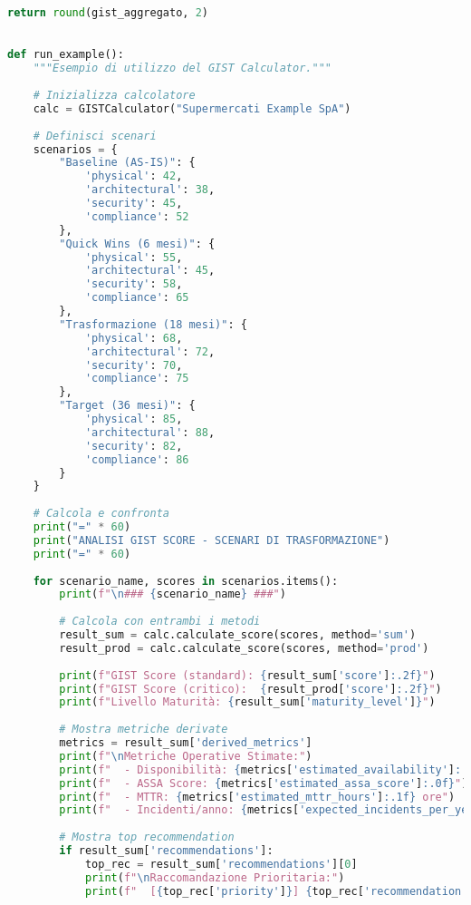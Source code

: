 \begin{lstlisting}[language=Python, caption={Implementazione completa GIST Calculator con validazione e reporting}]
    return round(gist_aggregato, 2)
    

def run_example():
    """Esempio di utilizzo del GIST Calculator."""
    
    # Inizializza calcolatore
    calc = GISTCalculator("Supermercati Example SpA")
    
    # Definisci scenari
    scenarios = {
        "Baseline (AS-IS)": {
            'physical': 42,
            'architectural': 38,
            'security': 45,
            'compliance': 52
        },
        "Quick Wins (6 mesi)": {
            'physical': 55,
            'architectural': 45,
            'security': 58,
            'compliance': 65
        },
        "Trasformazione (18 mesi)": {
            'physical': 68,
            'architectural': 72,
            'security': 70,
            'compliance': 75
        },
        "Target (36 mesi)": {
            'physical': 85,
            'architectural': 88,
            'security': 82,
            'compliance': 86
        }
    }
    
    # Calcola e confronta
    print("=" * 60)
    print("ANALISI GIST SCORE - SCENARI DI TRASFORMAZIONE")
    print("=" * 60)
    
    for scenario_name, scores in scenarios.items():
        print(f"\n### {scenario_name} ###")
        
        # Calcola con entrambi i metodi
        result_sum = calc.calculate_score(scores, method='sum')
        result_prod = calc.calculate_score(scores, method='prod')
        
        print(f"GIST Score (standard): {result_sum['score']:.2f}")
        print(f"GIST Score (critico):  {result_prod['score']:.2f}")
        print(f"Livello Maturità: {result_sum['maturity_level']}")
        
        # Mostra metriche derivate
        metrics = result_sum['derived_metrics']
        print(f"\nMetriche Operative Stimate:")
        print(f"  - Disponibilità: {metrics['estimated_availability']:.3f}%")
        print(f"  - ASSA Score: {metrics['estimated_assa_score']:.0f}")
        print(f"  - MTTR: {metrics['estimated_mttr_hours']:.1f} ore")
        print(f"  - Incidenti/anno: {metrics['expected_incidents_per_year']:.0f}")
        
        # Mostra top recommendation
        if result_sum['recommendations']:
            top_rec = result_sum['recommendations'][0]
            print(f"\nRaccomandazione Prioritaria:")
            print(f"  [{top_rec['priority']}] {top_rec['recommendation']}")
    

\end{lstlisting}
